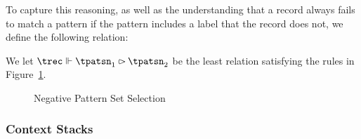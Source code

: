 \documentclass[nocopyright]{sigplanconf}
\begin{document}
To capture this reasoning, as well as the understanding that a record always fails to match a pattern if the pattern includes a label that the record does not, we define the following relation:

\begin{definition}
    We let $\negativePatternSelectCase{\trec}{\tpatsn_1}{\tpatsn_2}$ be the least relation satisfying the rules in Figure~\ref{fig_selectCase}.
\end{definition}

\begin{figure}
    \begin{mathpar}



    \end{mathpar}
    \caption{Negative Pattern Set Selection}
    \label{fig_selectCase}
\end{figure}

\subsubsection{Context Stacks}
\end{document}
